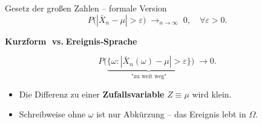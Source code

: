 \documentclass[aspectratio=169]{beamer}
\begin{document}
\begin{frame}{Gesetz der großen Zahlen – formale Version}
\small
\[
P\!\bigl(|\bar X_n-\mu|>\varepsilon\bigr)\;\longrightarrow_{n\to\infty}\;0,
\quad\forall\varepsilon>0.
\]

\medskip
\textbf{Kurzform $\;$vs.$\;$Ereignis‐Sprache}

\[
P\!\bigl(\underbrace{\{\omega:|\bar X_n(\omega)-\mu|>\varepsilon\}}_{\text{"zu weit weg"}}\bigr)\;\to 0.
\]

\begin{itemize}
  \item Die Differenz zu einer \textbf{Zufallsvariable} $Z\equiv\mu$ wird klein.  
  \item Schreibweise ohne $\omega$ ist nur Abkürzung – das Ereignis lebt in \(\Omega\).
\end{itemize}
\end{frame}
\end{document}
